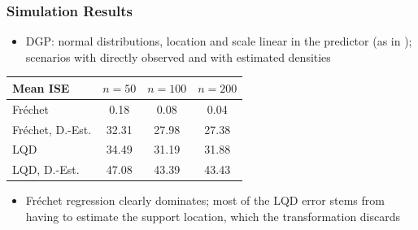 \documentclass[11pt, aspectratio=169]{beamer}
\begin{document}
\begin{frame}
    \frametitle{Simulation Results}
    \begin{itemize}
        \item DGP: normal distributions, location and scale linear in the predictor
        (as in \textcite{PetersenMüller2019}); scenarios with directly observed and
        with estimated densities
    \end{itemize}
    \begin{table}
        \centering
        \begin{tabular}{lccc}
            \hline
            Mean ISE & $n = 50$ & $n = 100$ & $n = 200$ \\
            \hline
            Fréchet             & 0.18 & 0.08 & 0.04 \\
            Fréchet, D.-Est.    & 32.31 & 27.98 & 27.38 \\
            LQD                 & 34.49 & 31.19 & 31.88 \\
            LQD, D.-Est.        & 47.08 & 43.39 & 43.43 \\
            \hline
        \end{tabular}
    \end{table}
    \begin{itemize}
        \item Fréchet regression clearly dominates; most of the LQD error stems from
        having to estimate the support location, which the transformation discards
    \end{itemize}
\end{frame}
\end{document}
